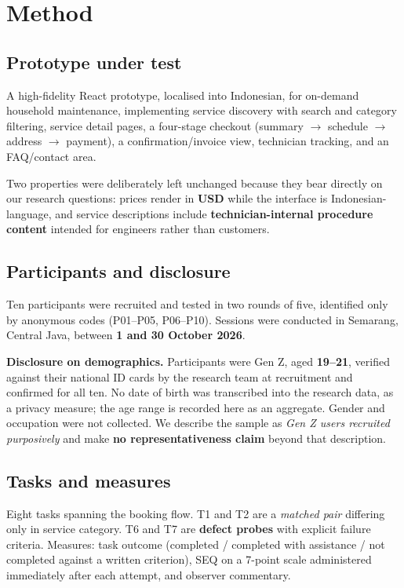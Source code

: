 \documentclass[]{interact}
\theoremstyle{plain}
\begin{document}
\section{Method}
\label{sec:method}

\subsection{Prototype under test}

A high-fidelity React prototype, localised into Indonesian, for on-demand household maintenance,
implementing service discovery with search and category filtering, service detail pages, a four-stage
checkout (summary $\rightarrow$ schedule $\rightarrow$ address $\rightarrow$ payment), a
confirmation/invoice view, technician tracking, and an FAQ/contact area.

Two properties were deliberately left unchanged because they bear directly on our research questions:
prices render in \textbf{USD} while the interface is Indonesian-language, and service descriptions
include \textbf{technician-internal procedure content} intended for engineers rather than customers.

\subsection{Participants and disclosure}

Ten participants were recruited and tested in two rounds of five, identified only by anonymous codes
(P01--P05, P06--P10). Sessions were conducted in Semarang, Central Java, between \textbf{1 and 30
October 2026}.

\textbf{Disclosure on demographics.} Participants were Gen Z, aged \textbf{19--21}, verified against
their national ID cards by the research team at recruitment and confirmed for all ten. No date of
birth was transcribed into the research data, as a privacy measure; the age range is recorded here as an
aggregate. Gender and occupation were not collected. We describe the sample as \emph{Gen Z users
recruited purposively} and make \textbf{no representativeness claim} beyond that description.

\subsection{Tasks and measures}

Eight tasks spanning the booking flow. T1 and T2 are a \emph{matched pair} differing only in service
category. T6 and T7 are \textbf{defect probes} with explicit failure criteria. Measures: task outcome
(completed / completed with assistance / not completed against a written criterion), SEQ on a 7-point
scale administered immediately after each attempt, and observer commentary.
\end{document}
